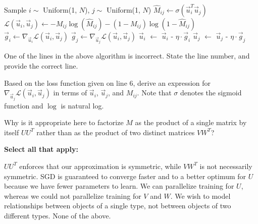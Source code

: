 \documentclass[11pt,addpoints,answers]{exam}
\newcommand{\sall}{\textbf{Select all that apply: }}
\begin{document}
\begin{questions}
\begin{parts}
\begin{algorithm}
\begin{algorithmic}[1]
    \State Sample $i \sim$ Uniform(1, $N$), $j \sim$ Uniform(1, $N$)
    \State $\hat{M}_{ij} \gets \sigma(\vec{u}_i^T \vec{u}_j)$ 
    \State $\mathcal{L}(\vec{u}_i, \vec{u}_j) \gets -M_{ij} \log(\hat{M}_{ij}) - (1-M_{ij})\log(1 - \hat{M}_{ij})$
    \State $\vec{g}_i \gets \nabla_{\vec{u}_i} \mathcal{L}(\vec{u}_i, \vec{u}_j)$
    \State $\vec{g}_j \gets \nabla_{\vec{u}_j} \mathcal{L}(\vec{u}_i, \vec{u}_j)$
    \State $\vec{u}_i$ $\gets$ $\vec{u}_i$ - $\eta \cdot \vec{g}_i$
    \State $\vec{u}_j$ $\gets$ $\vec{u}_j$ - $\eta \cdot \vec{g}_j$
\EndWhile

\end{algorithmic}
\end{algorithm}

\begin{subparts}
\subpart[2] One of the lines in the above algorithm is incorrect. State the line number, and provide the correct line.\\
    \begin{your_solution}[title=Line \#, height=2cm, width=.2\textwidth]
    \end{your_solution}
    \begin{your_solution}[title=Fixed line of code, height=2cm, width=.75\textwidth]
    \end{your_solution}

\subpart[1] Based on the loss function given on line 6, derive an expression for $\nabla_{\vec{u}_j} \mathcal{L}(\vec{u}_i, \vec{u}_j)$ in terms of $\vec{u}_i$, $\vec{u}_j$, and $M_{ij}$. Note that $\sigma$ denotes the sigmoid function and $\log$ is natural log. \\
    \begin{your_solution}[height=3cm, width=.95\textwidth]
    \end{your_solution}
    

\subpart[2] Why is it appropriate here to factorize $M$ as the product of a single matrix by itself $U U^T$ rather than as the product of two distinct matrices $VW^T$?

    \sall
    {\checkboxchar{$\Box$} \checkedchar{$\blacksquare$}
    \begin{checkboxes}
    \choice $U U^T$ enforces that our approximation is symmetric, while $VW^T$ is not necessarily symmetric.
    \choice SGD is guaranteed to converge faster and to a better optimum for $U$ because we have fewer parameters to learn.
    \choice We can parallelize training for $U$, whereas we could not parallelize training for $V$ and $W$.
    \choice We wish to model relationships between objects of a single type, not between objects of two different types.
    \choice None of the above.
    \end{checkboxes}
    }
    


\end{subparts}
\end{parts}
\end{questions}
\end{document}
